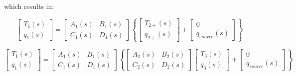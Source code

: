 which results in:

\begin{equation}
\left[ {\begin{array}{*{20}{c}}{{T_1}\left( s \right)}\\ {{q_1}\left( s \right)}\end{array}} \right] = \left[ {\begin{array}{*{20}{c}}{{A_1}\left( s \right)}&{{B_1}\left( s \right)}\\ {{C_1}\left( s \right)}&{{D_1}\left( s \right)}\end{array}} \right]\left\{ {\left[ {\begin{array}{*{20}{c}}{{T_{2 + }}\left( s \right)}\\ {{q_{2 + }}\left( s \right)}\end{array}} \right] + \left[ {\begin{array}{*{20}{c}}0\\ {{q_{source}}\left( s \right)}\end{array}} \right]} \right\}
\end{equation}

\begin{equation}
\left[ {\begin{array}{*{20}{c}}{{T_1}\left( s \right)}\\ {{q_1}\left( s \right)}\end{array}} \right] = \left[ {\begin{array}{*{20}{c}}{{A_1}\left( s \right)}&{{B_1}\left( s \right)}\\ {{C_1}\left( s \right)}&{{D_1}\left( s \right)}\end{array}} \right]\left\{ {\left[ {\begin{array}{*{20}{c}}{{A_2}\left( s \right)}&{{B_2}\left( s \right)}\\ {{C_2}\left( s \right)}&{{D_2}\left( s \right)}\end{array}} \right]\left[ {\begin{array}{*{20}{c}}{{T_3}\left( s \right)}\\ {{q_3}\left( s \right)}\end{array}} \right] + \left[ {\begin{array}{*{20}{c}}0\\ {{q_{source}}\left( s \right)}\end{array}} \right]} \right\}
\end{equation}

